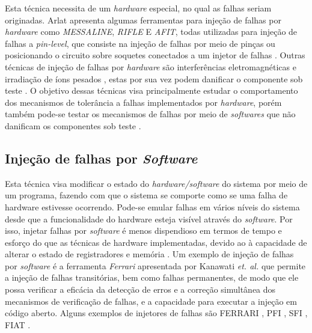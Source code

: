 Esta técnica necessita de um \textit{hardware} especial, no qual as falhas seriam originadas. Arlat \cite{Arlat:2003} apresenta algumas ferramentas para injeção de falhas por \textit{hardware} como \textit{MESSALINE}, \textit{RIFLE} E \textit{AFIT}, todas utilizadas para injeção de falhas a \textit{pin-level}, que consiste na injeção de falhas por meio de pinças ou posicionando o circuito sobre soquetes conectados a um injetor de falhas \cite{Arlat:1990, Arlat:2003}. Outras técnicas de injeção de falhas por \textit{hardware} são interferências eletromagnéticas e irradiação de íons pesados \cite{Gunnelo:1989, Arlat:1990, Arlat:2003}, estas por sua vez podem danificar o componente sob teste \cite{Sotoma:1997}. O objetivo dessas técnicas visa principalmente estudar o comportamento dos mecanismos de tolerância a falhas implementados por \textit{hardware}, porém também pode-se testar os mecanismos de falhas por meio de \textit{softwares} que não danificam os componentes sob teste \cite{Martins:1989}.


\subsection{Injeção de falhas por \textit{Software}}

Esta técnica visa modificar o estado do \textit{hardware/software} do sistema por meio de um programa, fazendo com que o sistema se comporte como se uma falha de hardware estivesse ocorrendo. Pode-se emular falhas em vários níveis do sistema desde que a funcionalidade do hardware esteja visível através do \textit{software}. Por isso, injetar falhas por \textit{software} é menos dispendioso em termos de tempo e esforço do que as técnicas de hardware implementadas, devido ao à capacidade de alterar o estado de registradores e memória \cite{Kanawati:1995}. Um exemplo de injeção de falhas por \textit{software} é a ferramenta \textit{Ferrari} apresentada por Kanawati \textit{et. al.} \cite{Kanawati:1995} que permite a injeção de falhas transitórias, bem como falhas permanentes, de modo que ele possa verificar a eficácia da detecção de erros e a correção simultânea dos mecanismos de verificação de falhas, e a capacidade para executar a injeção em código aberto. Alguns exemplos de injetores de falhas são FERRARI \cite{Kanawati:1995}, PFI \cite{Dawson:1995}, SFI \cite{Rosenberg:1993}, FIAT \cite{Segall:1988}. 


